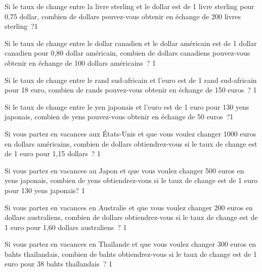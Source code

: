 \documentclass[a4paper,11pt]{report}
\begin{document}
\begin{exo} %
{Si le taux de change entre la livre sterling et le dollar est de 1 livre sterling pour 0,75 dollar, combien de dollars pouvez-vous obtenir en échange de 200 livres sterling~?}{1}
\end{exo}

\begin{exo} %
{Si le taux de change entre le dollar canadien et le dollar américain est de 1 dollar canadien pour 0,80 dollar américain, combien de dollars canadiens pouvez-vous obtenir en échange de 100 dollars américains~?
}{1}
\end{exo}

\begin{exo} %
{Si le taux de change entre le rand sud-africain et l'euro est de 1 rand sud-africain pour 18 euro, combien de rands pouvez-vous obtenir en échange de 150 euros~?
}{1}
\end{exo}

\begin{exo} %
{Si le taux de change entre le yen japonais et l'euro est de  1 euro pour 130 yens japonais, combien de yens pouvez-vous obtenir en échange de 50 euros~?}{1}
\end{exo}

\newpage
\begin{exo} %
{Si vous partez en vacances aux États-Unis et que vous voulez changer 1000 euros en dollars américains, combien de dollars obtiendrez-vous si le taux de change est de 1 euro pour 1,15 dollars~?
}{1}
\end{exo}

\begin{exo} %
{Si vous partez en vacances au Japon et que vous voulez changer 500 euros en yens japonais, combien de yens obtiendrez-vous si le taux de change est de 1 euro pour 130 yens japonais?
}{1}
\end{exo}


\begin{exo} %
{Si vous partez en vacances en Australie et que vous voulez changer 200 euros en dollars australiens, combien de dollars obtiendrez-vous si le taux de change est de 1 euro pour  1,60 dollars australiens~?
}{1}
\end{exo}


\begin{exo} %
{Si vous partez en vacances en Thaïlande et que vous voulez changer 300 euros en bahts thaïlandais, combien de bahts obtiendrez-vous si le taux de change est de 1 euro pour  38 bahts thaïlandais~?
\vspace{-0.1cm}
}{1}
\end{exo}
\end{document}
